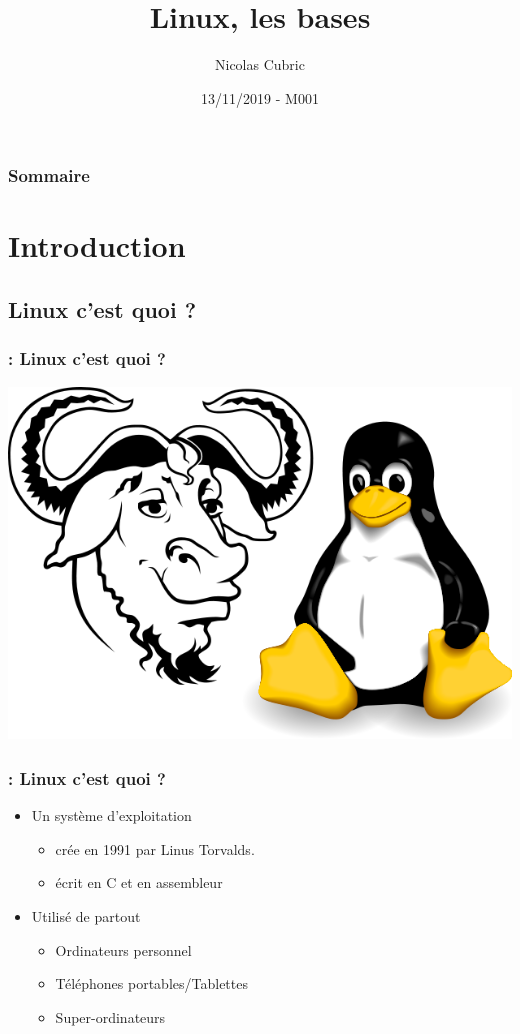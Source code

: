 \documentclass[13pt]{beamer}
\title{Linux, les bases}
\author{Nicolas Cubric}
\date{13/11/2019 - M001}
\newenvironment{slide}[1]{
  \begin{frame}[environment=slide]
    \frametitle{\textbf{\insertsection}  : #1}}
{\end{frame}}
\begin{document}
\begin{frame}
\maketitle
\end{frame}

\begin{frame}
  \frametitle{\textbf{Sommaire}}
  \tableofcontents
\end{frame}

\section{Introduction}
\subsection{Linux c'est quoi ?}

\begin{slide}{Linux c'est quoi ?}
  \begin{center}
    \includegraphics[scale=0.25]{Images/GNU_TUX.png}
  \end{center}
\end{slide}

\begin{slide}{Linux c'est quoi ?}
  \begin{itemize}
    \item Un système d'exploitation
      \begin{itemize}
        \item crée en 1991 par Linus Torvalds.
        \item écrit en C et en assembleur
      \end{itemize}
    \item Utilisé de partout
    \begin{itemize}
      \item Ordinateurs personnel
      \item Téléphones portables/Tablettes
      \item Super-ordinateurs
    \end{itemize}
  \end{itemize}
\end{slide}
\end{document}
